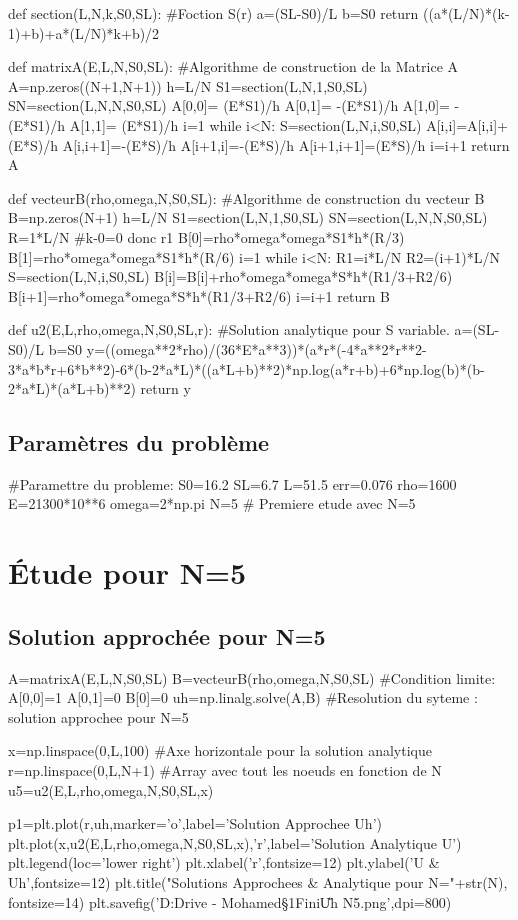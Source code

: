 \documentclass[a4paper,10pt]{report} %
\begin{document}
\begin{python}
def section(L,N,k,S0,SL): #Foction S(r)
    a=(SL-S0)/L
    b=S0
    return ((a*(L/N)*(k-1)+b)+a*(L/N)*k+b)/2


def matrixA(E,L,N,S0,SL): #Algorithme de construction de la Matrice A
    A=np.zeros((N+1,N+1))
    h=L/N
    S1=section(L,N,1,S0,SL)
    SN=section(L,N,N,S0,SL)
    A[0,0]= (E*S1)/h
    A[0,1]= -(E*S1)/h
    A[1,0]= -(E*S1)/h
    A[1,1]= (E*S1)/h
    i=1
    while i<N:
        S=section(L,N,i,S0,SL)
        A[i,i]=A[i,i]+(E*S)/h
        A[i,i+1]=-(E*S)/h
        A[i+1,i]=-(E*S)/h
        A[i+1,i+1]=(E*S)/h
        i=i+1
    return A

def vecteurB(rho,omega,N,S0,SL): #Algorithme de construction du vecteur B
    B=np.zeros(N+1)
    h=L/N
    S1=section(L,N,1,S0,SL)
    SN=section(L,N,N,S0,SL)
    R=1*L/N #k-0=0 donc r1
    B[0]=rho*omega*omega*S1*h*(R/3)
    B[1]=rho*omega*omega*S1*h*(R/6)
    i=1
    while i<N:
        R1=i*L/N
        R2=(i+1)*L/N
        S=section(L,N,i,S0,SL)
        B[i]=B[i]+rho*omega*omega*S*h*(R1/3+R2/6)
        B[i+1]=rho*omega*omega*S*h*(R1/3+R2/6)
        i=i+1
    return B

def u2(E,L,rho,omega,N,S0,SL,r): #Solution analytique pour S variable.
    a=(SL-S0)/L
    b=S0
    y=((omega**2*rho)/(36*E*a**3))*(a*r*(-4*a**2*r**2-3*a*b*r+6*b**2)-6*(b-2*a*L)*((a*L+b)**2)*np.log(a*r+b)+6*np.log(b)*(b-2*a*L)*(a*L+b)**2)
    return y
\end{python}

\subsection{Paramètres du problème}

\begin{python}
#Paramettre du probleme:
S0=16.2
SL=6.7
L=51.5
err=0.076
rho=1600
E=21300*10**6
omega=2*np.pi
N=5 # Premiere etude avec N=5
\end{python}

\section{Étude pour N=5}
\subsection{Solution approchée pour N=5}
\begin{python}
A=matrixA(E,L,N,S0,SL)
B=vecteurB(rho,omega,N,S0,SL)
#Condition limite:
A[0,0]=1
A[0,1]=0
B[0]=0
uh=np.linalg.solve(A,B) #Resolution du syteme : solution approchee pour N=5

x=np.linspace(0,L,100) #Axe horizontale pour la solution analytique
r=np.linspace(0,L,N+1) #Array avec tout les noeuds en fonction de N
u5=u2(E,L,rho,omega,N,S0,SL,x)

p1=plt.plot(r,uh,marker='o',label='Solution Approchee Uh')
plt.plot(x,u2(E,L,rho,omega,N,S0,SL,x),'r',label='Solution Analytique U')
plt.legend(loc='lower right')
plt.xlabel('r',fontsize=12)
plt.ylabel('U & Uh',fontsize=12)
plt.title("Solutions Approchees & Analytique pour N="+str(N), fontsize=14)
plt.savefig('D:\Google Drive - Mohamed\Cours\S1\Element Fini\U Uh N5.png',dpi=800)
\end{python}
\end{document}
